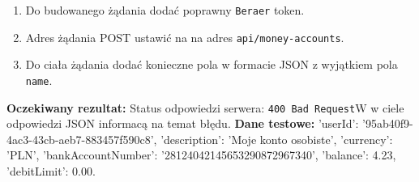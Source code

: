 \begin{enumerate}[labelwidth=1em,label=\Roman*]
\begin{enumerate}[label=\arabic*.]
        \item Do budowanego żądania dodać poprawny \texttt{Beraer} token.
        \item Adres żądania POST ustawić na na adres \texttt{api/money-accounts}.
        \item Do ciała żądania dodać konieczne pola w formacie JSON z wyjątkiem pola \texttt{name}.
    \end{enumerate}
    \textbf{Oczekiwany rezultat:}  Status odpowiedzi serwera: \texttt{400 Bad Request}W w ciele odpowiedzi JSON informacą na temat błędu. \newline
    \textbf{Dane testowe:} 'userId': '95ab40f9-4ac3-43cb-aeb7-883457f590c8', 'description': 'Moje konto osobiste', 'currency': 'PLN', 'bankAccountNumber': '28124042145653290872967340', 'balance': 4.23, 'debitLimit': 0.00.
\end{enumerate}

